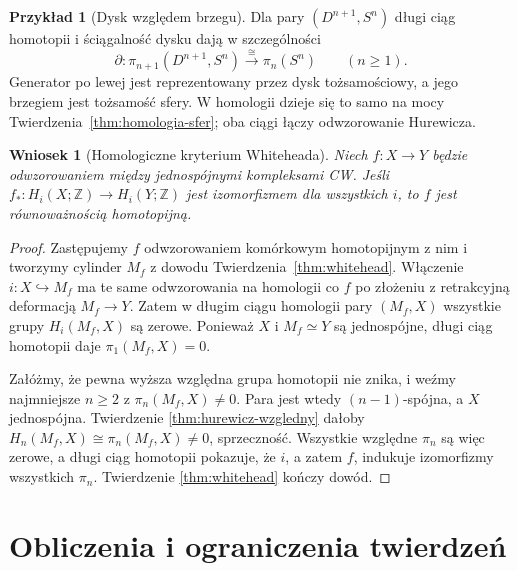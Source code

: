 \documentclass[11pt,a4paper,oneside]{report}
\newcommand{\Z}{\mathbb{Z}}
\theoremstyle{plain}
\newtheorem{wniosek}[twierdzenie]{Wniosek}
\theoremstyle{definition}
\newtheorem{przyklad}[twierdzenie]{Przykład}
\theoremstyle{remark}
\begin{document}
\begin{przyklad}[Dysk względem brzegu]
\label{prz:pi-dysk-brzeg}
Dla pary $(D^{n+1},S^n)$
długi ciąg homotopii
i ściągalność dysku
dają w szczególności
\[
 \partial:
 \pi_{n+1}(D^{n+1},S^n)
 \xrightarrow{\ \cong\ }
 \pi_n(S^n)
 \qquad(n\geq1).
\]
Generator po lewej jest reprezentowany przez dysk tożsamościowy,
a jego brzegiem jest
tożsamość sfery.
W homologii dzieje się
to samo na mocy
Twierdzenia~\ref{thm:homologia-sfer};
oba ciągi łączy odwzorowanie
Hurewicza.
\end{przyklad}

\begin{wniosek}[Homologiczne kryterium Whiteheada]
\label{cor:whitehead-homologiczny}
Niech $f:X\to Y$ będzie odwzorowaniem
między jednospójnymi
kompleksami CW.
Jeśli
$f_*:H_i(X;\Z)\to H_i(Y;\Z)$
jest izomorfizmem
dla wszystkich $i$,
to $f$ jest
równoważnością
homotopijną.
\end{wniosek}
\begin{proof}
Zastępujemy $f$
odwzorowaniem komórkowym
homotopijnym z nim
i tworzymy cylinder
$M_f$ z dowodu
Twierdzenia~\ref{thm:whitehead}.
Włączenie
$i:X\hookrightarrow M_f$
ma te same odwzorowania
na homologii co $f$
po złożeniu z
retrakcyjną deformacją
$M_f\to Y$.
Zatem w długim
ciągu homologii
pary $(M_f,X)$
wszystkie grupy
$H_i(M_f,X)$
są zerowe.
Ponieważ $X$
i $M_f\simeq Y$
są jednospójne,
długi ciąg homotopii
daje
$\pi_1(M_f,X)=0$.

Załóżmy, że pewna
wyższa względna
grupa homotopii
nie znika, i weźmy
najmniejsze $n\geq2$
z $\pi_n(M_f,X)\ne0$.
Para jest wtedy
$(n-1)$-spójna,
a $X$ jednospójna.
Twierdzenie
\ref{thm:hurewicz-wzgledny}
dałoby
$H_n(M_f,X)\cong
\pi_n(M_f,X)\ne0$,
sprzeczność.
Wszystkie względne
$\pi_n$ są więc
zerowe, a długi
ciąg homotopii
pokazuje, że
$i$, a zatem $f$,
indukuje izomorfizmy
wszystkich $\pi_n$.
Twierdzenie
\ref{thm:whitehead}
kończy dowód.
\end{proof}

\section{Obliczenia i ograniczenia twierdzeń}
\label{sec:pi-przyklady}
\end{document}
